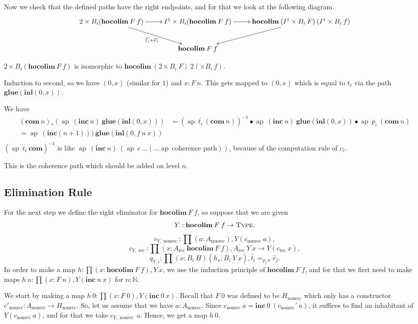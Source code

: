 \documentclass[a4paper,UKenglish]{lipics-v2016}
\newcommand{\Boperator}[1]{\mathrm{\mathbf{#1}}}
\newcommand{\conc}[0]{\bullet}
\newcommand{\rec}[0]{\operatorname{rec}}
\newcommand{\nonrec}[0]{\operatorname{nonrec}}
\newcommand{\ap}[0]{\operatorname{ap}}
\newcommand{\hocolim}[0]{\Boperator{hocolim}}
\newcommand{\inl}[0]{\Boperator{inl}}
\newcommand{\glue}[0]{\Boperator{glue}}
\newcommand{\inc}[0]{\Boperator{inc}}
\newcommand{\com}[0]{\Boperator{com}}
\newcommand{\Type}[0]{\operatorname{\textsc{Type}}}
\newcommand{\dak}[1]{\widehat{#1}}
\newcommand{\hatt}{\dak{t}}
\newcommand{\hatr}{\dak{r}}
\begin{document}
Now we check that the defined paths have the right endpoints, and for that we look at the following diagram.
\[
\xymatrix
{
	2 \times B_i(\hocolim \> F \> f) \ar[r] \ar[dr]_{\overline{t_i} + \overline{r_i}} & I^1 \times B_i(\hocolim \> F \> f) \ar[r] & \hocolim \> (I^1 \times B_i \> F) \> (I^1 \times B_i \> f) \ar[dl]\\
	& \hocolim \> F \> f
}
\]

$2 \times B_i(\hocolim \> F \> f)$ is isomorphic to $\hocolim \> (2 \times B_i \> F) \> 2 (\times B_i \> f)$.

Induction to second, so we have $(0, x)$ (similar for $1$) and $x : F \> n$.
This gets mapped to $(0, x)$ which is equal to $t_i$ via the path $\glue (\inl (0, x))$.

We have
\begin{equation*}
\begin{split}
(\com \> n)_*(\ap \> (\inc \> n) \> \glue (\inl (0, x))) 
&= (\ap \> \overline{t_i} \> (\com \> n))^{-1} \conc \ap \> (\inc \> n) \> \glue (\inl (0, x)) \conc \ap \> p_i \> (\com \> n)\\
= \ap \> (\inc (n+1))) \>\glue (\inl (0, f \> n \> x))\\
\end{split}
\end{equation*}
$(\ap \> \overline{t_i} \> \com)^{-1}$ is like $\ap \> (\inc \> n) \> (\ap \> c \> \ldots (\ldots \ap \> \text{coherence path}))$, because of the computation rule of $c_i$.

This is the coherence path which should be added on level $n$.


\subsection{Elimination Rule}
For the next step we define the right eliminator for $\hocolim \> F \> f$, so suppose that we are given
\[
Y : \hocolim \> F \> f \rightarrow \Type,
\]
\[
c_{Y, \nonrec} : \prod (a : A_{\nonrec}), Y(c_{\nonrec} \> a),
\]
\[
c_{Y, \rec} : \prod (x : A_{\rec} \> \hocolim \> F \> f), \overline{A_{\rec}} \> Y \> x \rightarrow Y(c_{\rec} \> x),
\]
\[
q_{Y, i} : \prod (x : B_i \> H)(h_x : \overline{B_i} \> Y \> x), \hatt_i =_{p_j \, x} \hatr_j.
\]
In order to make a map $h : \prod (x : \hocolim \> F \> f), Y \> x$, we use the induction principle of $\hocolim \> F \> f$, and for that we first need to make maps $h \> n : \prod (x : F \> n), Y(\inc \> n \> x)$ for $n : \mathbb{N}$.

We start by making a map $h \> 0 : \prod (x : F \> 0), Y(\inc \> 0 \> x)$.
Recall that $F \> 0$ was defined to be $H_{\nonrec}$ which only has a constructor $c'_{\nonrec} : A_{\nonrec} \rightarrow H_{\nonrec}$.
So, let us assume that we have $a : A_{\nonrec}$.
Since $c_{\nonrec} \> a = \inc \> 0 \> (c_{\nonrec}' \> a)$, it suffices to find an inhabitant of $Y(c_{\nonrec} \> a)$, and for that we take $c_{Y, \nonrec} \> a$.
Hence, we get a map $h \> 0$.
\end{document}
